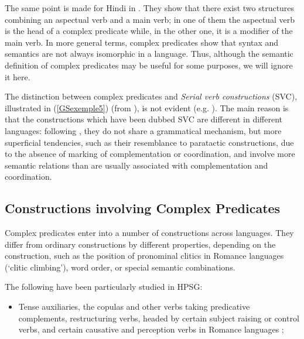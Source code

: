 \documentclass[output=paper
                ,modfonts
                ,nonflat
	        ,collection
	        ,collectionchapter
	        ,collectiontoclongg
 	        ,biblatex
                ,babelshorthands
                ,newtxmath
                ,draftmode
                ,colorlinks, citecolor=brown
]{./langsci/langscibook}
\begin{document}
{\begin{exe}
\begin{xlist}
	\end{xlist}
\end{exe}

The same point is made for Hindi in \cite{poornima2009hindi}. They show that there exist two structures combining an aspectual verb and a main verb; in one of them the aspectual verb is the head of a complex predicate while, in the other one, it is a modifier of the main verb. In more general terms, complex predicates show that syntax and semantics are not always isomorphic in a language. Thus, although the semantic definition of complex predicates may be useful for some purposes, we will ignore it here.

The distinction between complex predicates and \textit{Serial verb constructions} (SVC), illustrated in (\ref{GSexemple5}) (from \citealt{MH2016}), is not evident (e.g. \citealt{andrews1999complex, MH2016}). The main reason is that the constructions which have been dubbed SVC are different in different languages: following \cite{andrews1999complex}, they do not share a grammatical mechanism, but more superficial tendencies, such as their resemblance to paratactic constructions, due to the absence of marking of complementation or coordination, and involve more semantic relations than are usually associated with complementation and coordination.

\begin{exe}
	\label{GSexemple5} 
\end{exe}

\subsection{Constructions involving Complex Predicates}\label{GSsection1.2}

Complex predicates enter into a number of constructions across languages. They differ from ordinary constructions by different properties, depending on the construction, such as the position of pronominal clitics in Romance languages (`clitic climbing'), word order, or special semantic combinations. 

The following have been particularly studied in HPSG:

\begin{itemize}
	
	\item Tense auxiliaries, the copulas and other verbs taking predicative complements, restructuring verbs, headed by certain subject raising or control verbs, and certain causative and perception verbs in Romance languages \citep{abeille1994complementation, abeille2000french, abeille2001deux, abeille2001varieties, AG2002b-u, AG2010, abeille1995doublestructure, abeille1998romance, AGS1998, Monachesi98a};
	

\end{itemize}}
\end{document}
